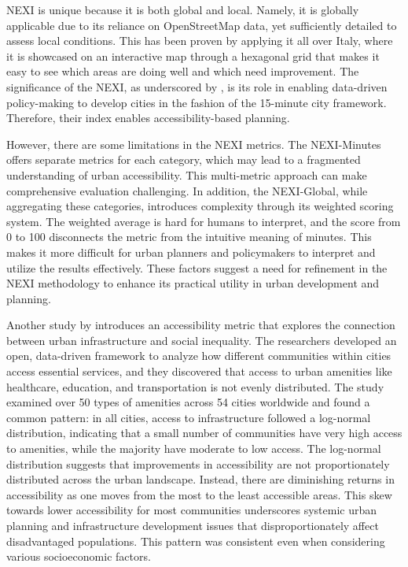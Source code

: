 NEXI is unique because it is both global and local. 
Namely, it is globally applicable due to its reliance on OpenStreetMap data, yet sufficiently detailed to assess local conditions.
This has been proven by applying it all over Italy, where it is showcased on an interactive map through a hexagonal grid that makes it easy to see which areas are doing well and which need improvement.
The significance of the NEXI, as underscored by , is its role in enabling data-driven policy-making to develop cities in the fashion of the 15-minute city framework. 
Therefore, their index enables accessibility-based planning.

However, there are some limitations in the NEXI metrics. 
The NEXI-Minutes offers separate metrics for each category, which may lead to a fragmented understanding of urban accessibility. 
This multi-metric approach can make comprehensive evaluation challenging. 
In addition, the NEXI-Global, while aggregating these categories, introduces complexity through its weighted scoring system. 
The weighted average is hard for humans to interpret, and the score from 0 to 100 disconnects the metric from the intuitive meaning of minutes.
This makes it more difficult for urban planners and policymakers to interpret and utilize the results effectively. 
These factors suggest a need for refinement in the NEXI methodology to enhance its practical utility in urban development and planning.


Another study by  introduces an accessibility metric that explores the connection between urban infrastructure and social inequality. 
The researchers developed an open, data-driven framework to analyze how different communities within cities access essential services, and they discovered that access to urban amenities like healthcare, education, and transportation is not evenly distributed. 
The study examined over 50 types of amenities across 54 cities worldwide and found a common pattern: in all cities, access to infrastructure followed a log-normal distribution, indicating that a small number of communities have very high access to amenities, while the majority have moderate to low access. 
The log-normal distribution suggests that improvements in accessibility are not proportionately distributed across the urban landscape. 
Instead, there are diminishing returns in accessibility as one moves from the most to the least accessible areas. 
This skew towards lower accessibility for most communities underscores systemic urban planning and infrastructure development issues that disproportionately affect disadvantaged populations.
This pattern was consistent even when considering various socioeconomic factors.


